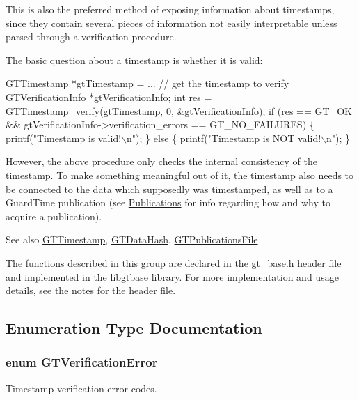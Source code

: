 This is also the preferred method of exposing information about timestamps, since they contain several pieces of information not easily interpretable unless parsed through a verification procedure.

The basic question about a timestamp is whether it is valid: 
\begin{DoxyPre}
    GTTimestamp *gtTimestamp = ... // get the timestamp to verify
    GTVerificationInfo *gtVerificationInfo;
    int res = GTTimestamp\_verify(gtTimestamp, 0, &gtVerificationInfo);
    if (res == GT\_OK \&\& gtVerificationInfo->verification\_errors == GT\_NO\_FAILURES) \{
        printf("Timestamp is valid!\(\backslash\)n");
    \} else \{
        printf("Timestamp is NOT valid!\(\backslash\)n");
    \}
\end{DoxyPre}


However, the above procedure only checks the internal consistency of the timestamp. To make something meaningful out of it, the timestamp also needs to be connected to the data which supposedly was timestamped, as well as to a GuardTime publication (see \hyperlink{group__publications}{Publications} for info regarding how and why to acquire a publication).

\begin{DoxySeeAlso}{See also}
\hyperlink{group__timestamps_gaddb792efe52216386853c94e7aeaf6ba}{GTTimestamp}, \hyperlink{group__common_ga96461884b56b666a19e99b5c872eb2a6}{GTDataHash}, \hyperlink{group__publications_gacf561fdbce4067eb94bd9761a71e7e5a}{GTPublicationsFile}
\end{DoxySeeAlso}
The functions described in this group are declared in the {\ttfamily \hyperlink{gt__base_8h}{gt\_\-base.h}} header file and implemented in the {\ttfamily libgtbase} library. For more implementation and usage details, see the notes for the header file. 

\subsection{Enumeration Type Documentation}
\hypertarget{group__verification_ga00f17574800248075712b4aa9a3faf93}{
\subsubsection[{GTVerificationError}]{\setlength{\rightskip}{0pt plus 5cm}enum {\bf GTVerificationError}}}
\label{group__verification_ga00f17574800248075712b4aa9a3faf93}
Timestamp verification error codes.


